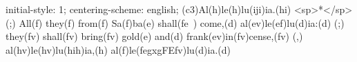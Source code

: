 initial-style: 1;
centering-scheme: english;
(c3)Al(h)le(h)lu(iji)ia.(hi) <sp>*</sp>(;) All(f) they(f) from(f) Sa(f)ba(e) shall(fe~) come,(d) al(ev)le(ef)lu(d)ia:(d) (;) they(fv) shall(fv) bring(fv) gold(e) and(d) frank(ev)in(fv)cense,(fv) (,) al(hv)le(hv)lu(hih)ia,(h) al(f)le(fegxgFEfv)lu(d)ia.(d)